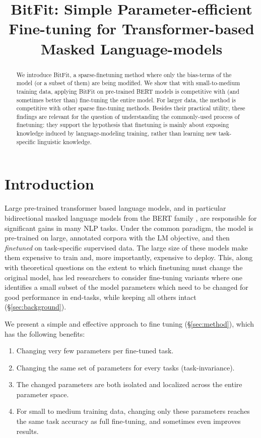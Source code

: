 \title{BitFit: Simple Parameter-efficient Fine-tuning for Transformer-based Masked Language-models}

\begin{abstract}
We introduce BitFit, a sparse-finetuning method where only the bias-terms of the model (or a subset of them) are being modified. We show that with small-to-medium training data, applying BitFit on pre-trained BERT models is competitive with (and sometimes better than) fine-tuning the entire model. For larger data, the method is competitive with other sparse fine-tuning methods. Besides their practical utility, these findings are relevant for the question of understanding the commonly-used process of finetuning: they support the hypothesis that finetuning is mainly about exposing knowledge induced by language-modeling training, rather than learning new task-specific linguistic knowledge.
\end{abstract}

\section{Introduction}

Large pre-trained transformer based language models, and in particular bidirectional masked language models from the BERT family \cite{BERT,ROBERTA,DBLP:journals/corr/abs-1907-10529}, are responsible for significant gains in many NLP tasks. Under the common paradigm, the model is pre-trained on large, annotated corpora with the LM objective, and then \emph{finetuned} on task-specific supervised data. The large size of these models make them expensive to train and, more importantly, expensive to deploy. This, along with theoretical questions on the extent to which finetuning must change the original model, has led researchers to consider fine-tuning variants where one identifies a small subset of the model parameters which need to be changed for good performance in end-tasks, while keeping all others intact (\S{\ref{sec:background}}). 

We present a simple and effective approach to fine tuning (\S\ref{sec:method}), which has the following benefits:

\begin{enumerate}[itemsep=-2px]
    \item Changing very few parameters per fine-tuned task.
    \item Changing the same set of parameters for every tasks (task-invariance).
    \item The changed parameters are both isolated and localized across the entire parameter space. 
    \item For small to medium training data, changing only these parameters reaches the same task accuracy as full fine-tuning, and sometimes even improves results.
\end{enumerate}

